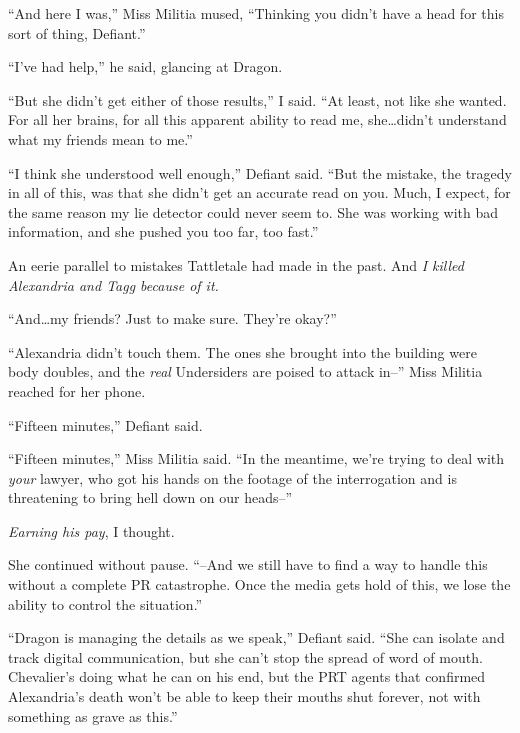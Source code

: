 ``And here I was,'' Miss Militia mused, ``Thinking you didn't have a head for this sort of thing, Defiant.''



``I've had help,'' he said, glancing at Dragon.



``But she didn't get either of those results,'' I said.  ``At least, not like she wanted.  For all her brains, for all this apparent ability to read me, she\ldots didn't understand what my friends mean to me.''



``I think she understood well enough,'' Defiant said.  ``But the mistake, the tragedy in all of this, was that she didn't get an accurate read on you.  Much, I expect, for the same reason my lie detector could never seem to.  She was working with bad information, and she pushed you too far, too fast.''



An eerie parallel to mistakes Tattletale had made in the past.  And\emph{ I killed Alexandria and Tagg because of it.}



``And\ldots my friends?  Just to make sure.  They're okay?''



``Alexandria didn't touch them.  The ones she brought into the building were body doubles, and the \emph{real }Undersiders are poised to attack in--''  Miss Militia reached for her phone.



``Fifteen minutes,'' Defiant said.



``Fifteen minutes,'' Miss Militia said.  ``In the meantime, we're trying to deal with \emph{your} lawyer, who got his hands on the footage of the interrogation and is threatening to bring hell down on our heads--''



\emph{Earning his pay}, I thought.



She continued without pause.  ``--And we still have to find a way to handle this without a complete PR catastrophe.  Once the media gets hold of this, we lose the ability to control the situation.''



``Dragon is managing the details as we speak,'' Defiant said.  ``She can isolate and track digital communication, but she can't stop the spread of word of mouth.  Chevalier's doing what he can on his end, but the PRT agents that confirmed Alexandria's death won't be able to keep their mouths shut forever, not with something as grave as this.''



